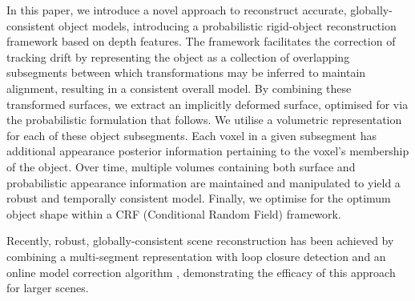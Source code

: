 
In this paper, we introduce a novel approach to reconstruct accurate, globally-consistent object models, introducing a probabilistic rigid-object reconstruction 
framework based on depth features. The framework facilitates the correction of tracking drift by representing the object as a
collection of overlapping subsegments between which transformations may be inferred to maintain alignment, resulting in a consistent
overall model. By combining these transformed surfaces, we extract an implicitly deformed surface, optimised for via the probabilistic formulation 
that follows. We utilise a volumetric representation for each of these object subsegments. Each voxel in a given subsegment has additional appearance posterior 
information pertaining to the voxel's membership of the object. Over time, multiple volumes containing both surface and probabilistic appearance information are 
maintained and manipulated to yield a robust and temporally consistent model. Finally, we optimise for the optimum object shape within a CRF 
(Conditional Random Field) framework.

Recently, robust, globally-consistent scene reconstruction has been achieved by combining a multi-segment representation with loop closure detection and an online model correction algorithm \cite{Kahler2016}, demonstrating the efficacy of this approach for larger scenes.

